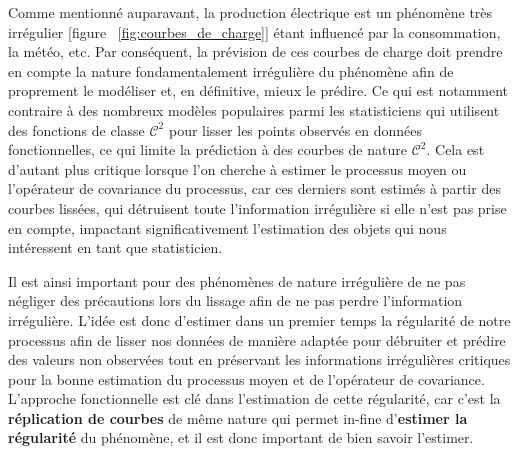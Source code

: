Comme mentionné auparavant, la production électrique est un phénomène très irrégulier [figure ~\ref{fig:courbes_de_charge}] étant influencé par la consommation, la météo, etc. Par conséquent, la prévision de ces courbes de charge doit prendre en compte la nature fondamentalement irrégulière du phénomène afin de proprement le modéliser et, en définitive, mieux le prédire. Ce qui est notamment contraire à des
nombreux modèles populaires parmi les statisticiens qui utilisent des fonctions de classe $\mathcal C^2$ pour lisser les points observés en données fonctionnelles, ce qui limite la prédiction à des courbes de nature $\mathcal C^2$. Cela est d'autant plus critique lorsque l'on cherche à estimer le processus moyen ou l'opérateur de covariance du processus, car ces derniers sont estimés à partir des courbes lissées, qui détruisent toute l'information irrégulière si elle n'est pas prise en compte, impactant significativement l'estimation des objets qui nous intéressent en tant que statisticien.




Il est ainsi important pour des phénomènes de nature irrégulière de ne pas négliger des précautions lors du lissage afin de ne pas perdre l'information irrégulière. L'idée est donc d'estimer dans un premier temps la régularité de notre processus afin de lisser nos données de manière adaptée pour débruiter et prédire des valeurs non observées tout en préservant les informations irrégulières critiques pour la bonne estimation du processus moyen et de l'opérateur de covariance. L'approche fonctionnelle est clé dans l'estimation de cette régularité, car c'est la \textbf{réplication de courbes} de même nature qui permet in-fine d'\textbf{estimer la régularité} du phénomène, et il est donc important de bien savoir l'estimer.
